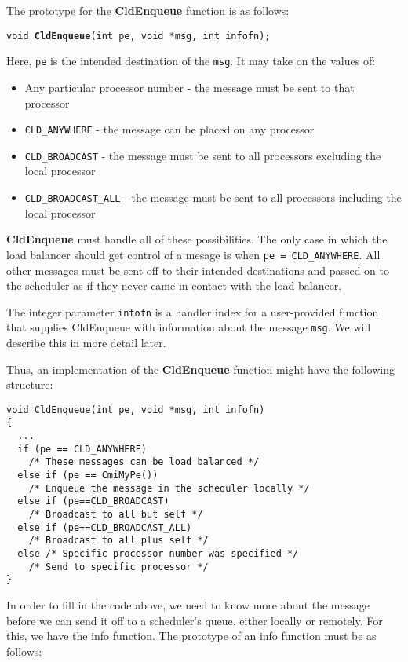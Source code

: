 \documentclass[11pt]{article}
\begin{document}
The prototype for the {\bf CldEnqueue} function is as follows:

{\tt void {\bf CldEnqueue}(int pe, void *msg, int infofn);}

Here, {\tt pe} is the intended destination of the {\tt msg}.  It may
take on the values of:

\begin{itemize}
\item Any particular processor number - the message must be sent to
that processor
\item {\tt CLD\_ANYWHERE} - the message can be placed on any processor
\item {\tt CLD\_BROADCAST} - the message must be sent to all processors
excluding the local processor
\item {\tt CLD\_BROADCAST\_ALL} - the message must be sent to all processors
including the local processor
\end{itemize}

{\bf CldEnqueue} must handle all of these possibilities.  The only
case in which the load balancer should get control of a mesage is when
{\tt pe = CLD\_ANYWHERE}.  All other messages must be sent off to their
intended destinations and passed on to the scheduler as if they never
came in contact with the load balancer. 

The integer parameter {\tt infofn} is a handler index for a
user-provided function that supplies CldEnqueue with information about
the message {\tt msg}.  We will describe this in more detail later.

Thus, an implementation of the {\bf CldEnqueue} function might have
the following structure:

\begin{verbatim}
void CldEnqueue(int pe, void *msg, int infofn)
{
  ...
  if (pe == CLD_ANYWHERE)
    /* These messages can be load balanced */
  else if (pe == CmiMyPe())
    /* Enqueue the message in the scheduler locally */
  else if (pe==CLD_BROADCAST) 
    /* Broadcast to all but self */
  else if (pe==CLD_BROADCAST_ALL)
    /* Broadcast to all plus self */
  else /* Specific processor number was specified */
    /* Send to specific processor */
}
\end{verbatim}

In order to fill in the code above, we need to know more about the
message before we can send it off to a scheduler's queue, either
locally or remotely.  For this, we have the info function.  The
prototype of an info function must be as follows:
\end{document}
